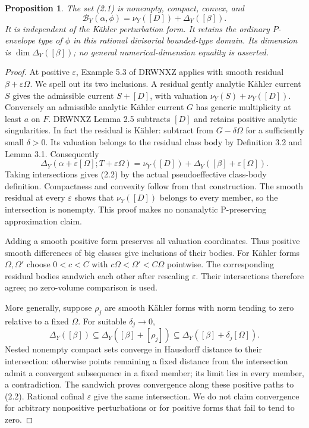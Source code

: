 \documentclass[11pt]{article}
\newtheorem{proposition}{Proposition}
\newcommand{\B}{\mathcal B}
\begin{document}
\begin{proposition}
The set (2.1) is nonempty, compact, convex, and
\[
 \B_Y(\alpha,\phi)=\nu_Y([D])+\Delta_Y([\beta]). \tag{2.2}
\]
It is independent of the K\"ahler perturbation form. It retains the ordinary $P$-envelope type of $\phi$ in this rational divisorial bounded-type domain. Its dimension is $\dim\Delta_Y([\beta])$; no general numerical-dimension equality is asserted.
\end{proposition}
\begin{proof}
At positive $\varepsilon$, Example 5.3 of DRWNXZ applies with smooth residual $\beta+\varepsilon\Omega$. We spell out its two inclusions. A residual gently analytic K\"ahler current $S$ gives the admissible current $S+[D]$, with valuation $\nu_Y(S)+\nu_Y([D])$. Conversely an admissible analytic K\"ahler current $G$ has generic multiplicity at least $a$ on $F$. DRWNXZ Lemma 2.5 subtracts $[D]$ and retains positive analytic singularities. In fact the residual is K\"ahler: subtract from $G-\delta\Omega$ for a sufficiently small $\delta>0$. Its valuation belongs to the residual class body by Definition 3.2 and Lemma 3.1. Consequently
\[
 \Delta_Y(\alpha+\varepsilon[\Omega];T+\varepsilon\Omega)
 =\nu_Y([D])+\Delta_Y([\beta]+\varepsilon[\Omega]). \tag{2.3}
\]
Taking intersections gives (2.2) by the actual pseudoeffective class-body definition. Compactness and convexity follow from that construction. The smooth residual at every $\varepsilon$ shows that $\nu_Y([D])$ belongs to every member, so the intersection is nonempty. This proof makes no nonanalytic P-preserving approximation claim.

Adding a smooth positive form preserves all valuation coordinates. Thus positive smooth differences of big classes give inclusions of their bodies. For K\"ahler forms $\Omega,\Omega'$ choose $0<c<C$ with $c\Omega<\Omega'<C\Omega$ pointwise. The corresponding residual bodies sandwich each other after rescaling $\varepsilon$. Their intersections therefore agree; no zero-volume comparison is used.

More generally, suppose $\rho_j$ are smooth K\"ahler forms with norm tending to zero relative to a fixed $\Omega$. For suitable $\delta_j\to0$,
\[
 \Delta_Y([\beta])\subseteq\Delta_Y([\beta]+[\rho_j])
 \subseteq\Delta_Y([\beta]+\delta_j[\Omega]).
\]
Nested nonempty compact sets converge in Hausdorff distance to their intersection: otherwise points remaining a fixed distance from the intersection admit a convergent subsequence in a fixed member; its limit lies in every member, a contradiction. The sandwich proves convergence along these positive paths to (2.2). Rational cofinal $\varepsilon$ give the same intersection. We do not claim convergence for arbitrary nonpositive perturbations or for positive forms that fail to tend to zero.
\end{proof}
\end{document}
